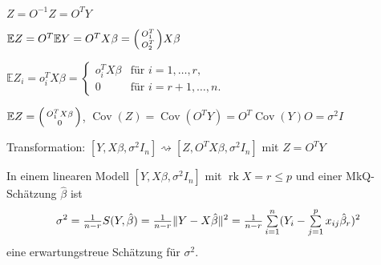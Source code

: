 \documentclass{cheat-sheet}
\newcommand{\E}{\mathbb{E}} %
\DeclareMathOperator{\rk}{rk} %
\DeclareMathOperator{\cov}{Cov} %
\newcommand{\Normal}{\mathcal{N}} %
\begin{document}
$Z = O^{-1} Z = O^T Y$

$\E Z = O^T \E Y = O^T X \beta = \begin{psmallmatrix}
  O_1^T \\ O_2^T
\end{psmallmatrix} X \beta$

$\E Z_i = o_i^T X \beta = \begin{cases}
  o_i^T X \beta & \text{für $i = 1, \ldots, r$,} \\
  0 & \text{für $i = r+1, \ldots, n$.}
\end{cases}$

$\E Z = \begin{psmallmatrix}
  O_1^T X \beta \\ 0
\end{psmallmatrix}$, $\cov(Z) = \cov(O^T Y) = O^T \cov(Y) O = \sigma^2 I$

Transformation: $[Y, X \beta, \sigma^2 I_n] \rightsquigarrow [Z, O^T X \beta, \sigma^2 I_n]$ mit $Z = O^T Y$

\begin{satz}
  In einem linearen Modell $[Y, X \beta, \sigma^2 I_n]$ mit $\rk X = r \leq p$ und einer MkQ-Schätzung $\hat{\beta}$ ist
  \[ \sigma^2 = \tfrac{1}{n-r} S(Y, \hat{\beta}) = \tfrac{1}{n-r} \norm{Y - X \hat\beta}^2 = \tfrac{1}{n-r} \sum_{i=1}^n (Y_i - \sum_{j=1}^p x_{ij} \hat\beta_r)^2 \]
  eine erwartungstreue Schätzung für $\sigma^2$.
\end{satz}


\end{document}
